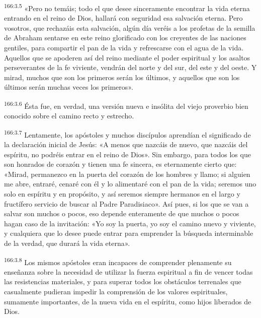 \par 
\textsuperscript{166:3.5} «Pero no temáis; todo el que desee sinceramente encontrar la vida eterna entrando en el reino de Dios, hallará con seguridad esa salvación eterna. Pero vosotros, que rechazáis esta salvación, algún día veréis a los profetas de la semilla de Abraham sentarse en este reino glorificado con los creyentes de las naciones gentiles, para compartir el pan de la vida y refrescarse con el agua de la vida. Aquellos que se apoderen así del reino mediante el poder espiritual y los asaltos perseverantes de la fe viviente, vendrán del norte y del sur, del este y del oeste. Y mirad, muchos que son los primeros serán los últimos, y aquellos que son los últimos serán muchas veces los primeros».

\par 
\textsuperscript{166:3.6} Ésta fue, en verdad, una versión nueva e insólita del viejo proverbio bien conocido sobre el camino recto y estrecho.

\par 
\textsuperscript{166:3.7} Lentamente, los apóstoles y muchos discípulos aprendían el significado de la declaración inicial de Jesús: «A menos que nazcáis de nuevo, que nazcáis del espíritu, no podréis entrar en el reino de Dios». Sin embargo, para todos los que son honrados de corazón y tienen una fe sincera, es eternamente cierto que: «Mirad, permanezco en la puerta del corazón de los hombres y llamo; si alguien me abre, entraré, cenaré con él y lo alimentaré con el pan de la vida; seremos uno solo en espíritu y en propósito, y así seremos siempre hermanos en el largo y fructífero servicio de buscar al Padre Paradisiaco». Así pues, si los que se van a salvar son muchos o pocos, eso depende enteramente de que muchos o pocos hagan caso de la invitación: «Yo soy la puerta, yo soy el camino nuevo y viviente, y cualquiera que lo desee puede entrar para emprender la búsqueda interminable de la verdad, que durará la vida eterna».

\par 
\textsuperscript{166:3.8} Los mismos apóstoles eran incapaces de comprender plenamente su enseñanza sobre la necesidad de utilizar la fuerza espiritual a fin de vencer todas las resistencias materiales, y para superar todos los obstáculos terrenales que casualmente pudieran impedir la comprensión de los valores espirituales, sumamente importantes, de la nueva vida en el espíritu, como hijos liberados de Dios.

